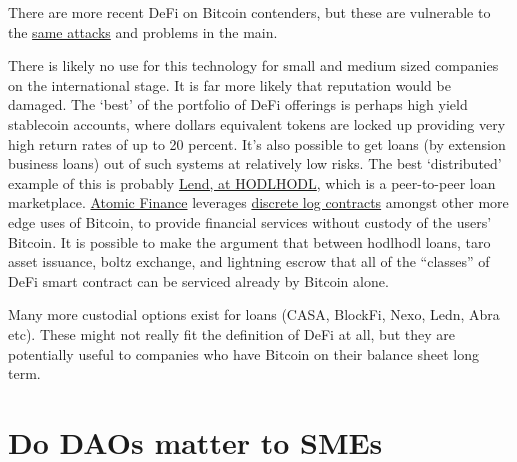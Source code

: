 There are more recent DeFi on Bitcoin contenders, but these are vulnerable to the \href{https://bisq.community/t/trading-halted-until-v1-3-0-hotfix/9208}{same attacks} and problems in the main. \par 
There is likely no use for this technology for small and medium sized companies on the international stage. It is far more likely that reputation would be damaged. The `best' of the portfolio of DeFi offerings is perhaps high yield stablecoin accounts, where dollars equivalent tokens are locked up providing very high return rates of up to 20 percent. It's also possible to get loans (by extension business loans) out of such systems at relatively low risks. The best `distributed' example of this is probably \href{https://lend.hodlhodl.com/}{Lend, at HODLHODL}, which is a peer-to-peer loan marketplace. \href{https://atomic.finance/blog/a-laypersons-guide-to-discreet-log-contracts-atomic-yield-series-part-3/}{Atomic Finance} leverages \href{https://adiabat.github.io/dlc.pdf}{discrete log contracts} amongst other more edge uses of Bitcoin, to provide financial services without custody of the users' Bitcoin. It is possible to make the argument that between hodlhodl loans, taro asset issuance, boltz exchange, and lightning escrow that all of the ``classes'' of DeFi smart contract can be serviced already by Bitcoin alone.\par
Many more custodial options exist for loans (CASA, BlockFi, Nexo, Ledn, Abra etc). These might not really fit the definition of DeFi at all, but they are potentially useful to companies who have Bitcoin on their balance sheet long term.\par
\section{Do DAOs matter to SMEs}
